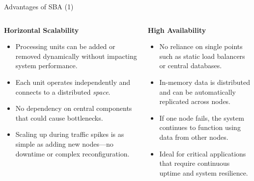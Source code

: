 \documentclass[aspectratio=169, table]{beamer}
\begin{document}
	\begin{frame}{Advantages of SBA (1)}
		\vspace{20pt}
		\begin{columns}[t]
			\begin{column}{0.5\textwidth}
				\textbf{Horizontal Scalability}
				\begin{itemize}
					\item Processing units can be added or removed dynamically without impacting system performance.
					\item Each unit operates independently and connects to a distributed \textit{space}.
					\item No dependency on central components that could cause bottlenecks.
					\item Scaling up during traffic spikes is as simple as adding new nodes—no downtime or complex reconfiguration.
				\end{itemize}
			\end{column}
			
			\begin{column}{0.5\textwidth}
				\textbf{High Availability}
				\begin{itemize}
					\item No reliance on single points such as static load balancers or central databases.
					\item In-memory data is distributed and can be automatically replicated across nodes.
					\item If one node fails, the system continues to function using data from other nodes.
					\item Ideal for critical applications that require continuous uptime and system resilience.
				\end{itemize}
			\end{column}
		\end{columns}
	\end{frame}
	
\end{document}
